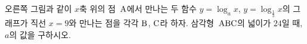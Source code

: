 \noindent\begin{minipage}[t]{0.58\linewidth}\vspace{0pt}\raggedright 오른쪽 그림과 같이 $x$축 위의 점~$\mathrm{A}$에서 만나는 두 함수 $y=\log_a x$, $y=\log_{\frac{1}{3}} x$의 그래프가 직선 $x=9$와 만나는 점을 각각 $\mathrm{B}$, $\mathrm{C}$라 하자. 삼각형~$\mathrm{ABC}$의 넓이가 $24$일 때, $a$의 값을 구하시오. \end{minipage}\hfill\begin{minipage}[t]{0.4\linewidth}\vspace{0pt}\centering \resizebox{\ifdim\width>\linewidth\linewidth\else\width\fi}{!}{}\end{minipage}\par
